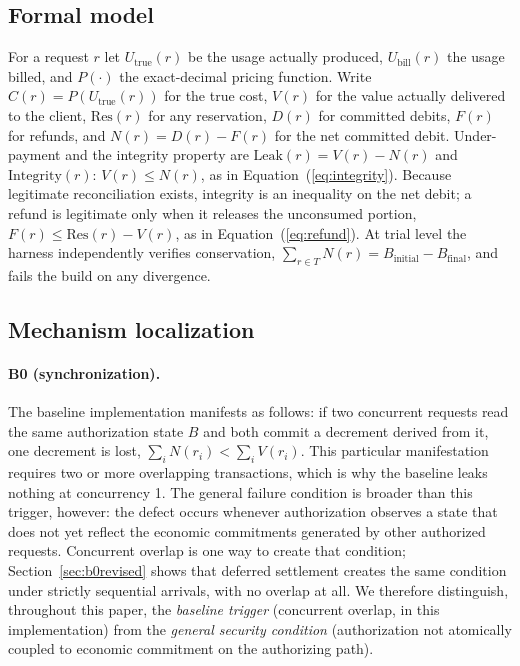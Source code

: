\documentclass[preprint,3p,authoryear,12pt]{elsarticle}
\begin{document}
\subsection{Formal model}
For a request $r$ let $U_{\text{true}}(r)$ be the usage actually produced,
$U_{\text{bill}}(r)$ the usage billed, and $P(\cdot)$ the exact-decimal pricing function.
Write $C(r) = P(U_{\text{true}}(r))$ for the true cost, $V(r)$ for the value actually
delivered to the client, $\mathrm{Res}(r)$ for any reservation, $D(r)$ for committed
debits, $F(r)$ for refunds, and $N(r) = D(r) - F(r)$ for the net committed debit.
Under-payment and the integrity property are $\mathrm{Leak}(r) = V(r) - N(r)$ and
$\mathrm{Integrity}(r):\, V(r) \le N(r)$, as in Equation~(\ref{eq:integrity}). Because
legitimate reconciliation exists, integrity is an inequality on the net debit; a refund is
legitimate only when it releases the unconsumed portion, $F(r) \le \mathrm{Res}(r) -
V(r)$, as in Equation~(\ref{eq:refund}). At trial level the harness independently verifies
conservation, $\sum_{r \in T} N(r) = B_{\text{initial}} - B_{\text{final}}$, and fails the
build on any divergence.

\subsection{Mechanism localization}
\paragraph{B0 (synchronization).}
The baseline implementation manifests as follows: if two concurrent requests read the
same authorization state $B$ and both commit a decrement derived from it, one decrement
is lost, $\sum_i N(r_i) < \sum_i V(r_i)$. This particular manifestation requires two or
more overlapping transactions, which is why the baseline leaks nothing at concurrency 1.
The general failure condition is broader than this trigger, however: the defect occurs
whenever authorization observes a state that does not yet reflect the economic
commitments generated by other authorized requests. Concurrent overlap is one way to
create that condition; Section~\ref{sec:b0revised} shows that deferred settlement creates
the same condition under strictly sequential arrivals, with no overlap at all. We
therefore distinguish, throughout this paper, the \emph{baseline trigger} (concurrent
overlap, in this implementation) from the \emph{general security condition}
(authorization not atomically coupled to economic commitment on the authorizing path).
\end{document}
